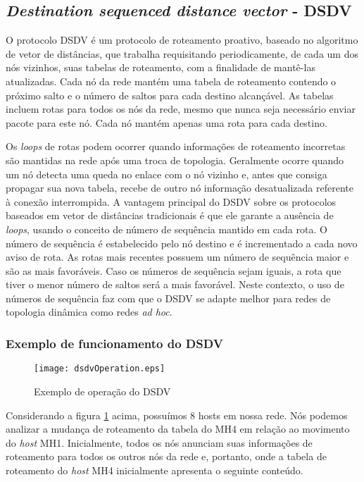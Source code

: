 \subsection{\textit{Destination sequenced distance vector} - DSDV} 
O protocolo DSDV \'e um protocolo de roteamento proativo\cite{gorantala}, baseado no algoritmo de vetor de dist\^ancias, que trabalha requisitando periodicamente, de cada um dos n\'os vizinhos, suas tabelas de roteamento, com a finalidade de mant\^e-las atualizadas. 
Cada n\'o da rede mant\'em uma tabela de roteamento contendo o pr\'oximo salto e o n\'umero de saltos para cada destino alcan\c{c}\'avel. 
As tabelas incluem rotas para todos os n\'os da rede, mesmo que nunca seja necess\'ario enviar pacote para este n\'o. 
Cada n\'o mant\'em apenas uma rota para cada destino.

Os \textit{loops} de rotas podem ocorrer quando informa\c{c}\~oes de roteamento incorretas s\~ao mantidas na rede ap\'os uma troca de topologia. 
Geralmente ocorre quando um n\'o detecta uma queda no enlace com o n\'o vizinho e, antes que consiga propagar sua nova tabela, recebe de outro n\'o informa\c{c}\~ao desatualizada referente \`a conex\~ao interrompida. 
A vantagem principal do DSDV sobre os protocolos baseados em vetor de dist\^ancias tradicionais \'e que ele garante a aus\^encia de \textit{loops}, usando o conceito de n\'umero de sequ\^encia mantido em cada rota. 
O n\'umero de sequ\^encia \'e estabelecido pelo n\'o destino e \'e incrementado a cada novo aviso de rota.
As rotas mais recentes possuem um n\'umero de sequ\^encia maior e s\~ao as mais favor\'aveis. 
Caso os n\'umeros de sequ\^encia sejam iguais, a rota que tiver o menor n\'umero de saltos ser\'a a mais favor\'avel. 
Neste contexto, o uso de n\'umeros de sequ\^encia faz com que o DSDV se adapte melhor para redes de topologia din\^amica como redes \textit{ad hoc}.

\subsubsection{Exemplo de funcionamento do DSDV}
\begin{figure}[H]
	\centering
	\texttt{[image: dsdvOperation.eps]}
	\caption{Exemplo de opera\c{c}\~ ao do DSDV}
	\label{figOpDSDV}
\end{figure}

Considerando a figura \ref{figOpDSDV} acima, possu\'imos 8 hosts em nossa rede. 
N\'os podemos analizar a mudan\c{c}a de roteamento da tabela do MH4 em rela\c{c}\~ao ao movimento do \textit{host} MH1. 
Inicialmente, todos os n\'os anunciam suas informa\c{c}\~oes de roteamento para todos os outros n\'os da rede e, portanto, onde a tabela de roteamento do \textit{host} MH4 inicialmente apresenta o seguinte conte\'udo.

